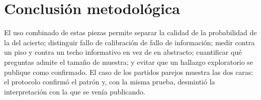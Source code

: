 \documentclass{pas}
\begin{document}
\section{Conclusión metodológica}

El uso combinado de estas piezas permite separar la calidad de la probabilidad de la del acierto; distinguir fallo
de calibración de fallo de información; medir contra un piso y contra un techo informativo en vez de en abstracto;
cuantificar qué preguntas admite el tamaño de muestra; y evitar que un hallazgo exploratorio se publique como
confirmado. El caso de los partidos parejos muestra las dos caras: el protocolo confirmó el patrón y, con la misma
prueba, desmintió la interpretación con la que se venía publicando.
\end{document}
